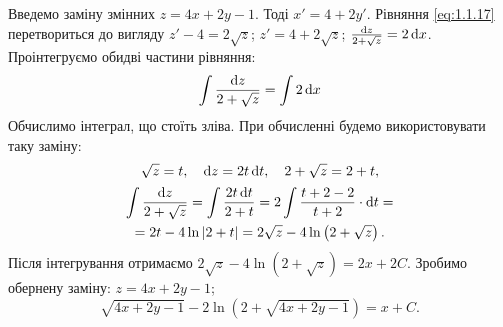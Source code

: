 \begin{solution}
	Введемо заміну змінних $z = 4 x + 2 y - 1$. Тоді $x' = 4 + 2 y'$. Рівняння \eqref{eq:1.1.17} перетвориться до вигляду $z' - 4 = 2 \sqrt{z}$; $z' = 4 + 2 \sqrt{z}$; $\frac{\mathop{}\!\mathrm{d} z}{2 + \sqrt{z}} = 2 \mathop{}\!\mathrm{d} x$. Проінтегруємо обидві частини рівняння:
	\begin{equation}
		\label{eq:1.1.18}
		\int \frac{\mathop{}\!\mathrm{d} z}{2 + \sqrt{z}} = \int 2 \mathop{}\!\mathrm{d} x
	\end{equation}
	Обчислимо інтеграл, що стоїть зліва. При обчисленні будемо використовувати таку заміну: 
	\begin{equation*}
		\sqrt{z} = t, \quad \mathop{}\!\mathrm{d} z = 2 t \mathop{}\!\mathrm{d} t, \quad 2 + \sqrt{z} = 2 + t,
	\end{equation*}
	\begin{multline}
		\label{eq:1.1.19}
		\int \frac{\mathop{}\!\mathrm{d} z}{2 + \sqrt{z}} = \int \frac{2 t \mathop{}\!\mathrm{d} t}{2 + t} = 2 \int \frac{t + 2 - 2}{t + 2} \cdot \mathop{}\!\mathrm{d} t = \\
		= 2 t - 4 \ln |2 + t| = 2 \sqrt{z} - 4 \ln \left(2 + \sqrt{z}\right).
	\end{multline}
	Після інтегрування отримаємо $2 \sqrt{z} - 4 \ln \left(2 + \sqrt{z}\right) = 2 x + 2 C$. Зробимо обернену заміну: $z = 4x + 2y - 1$;
	\begin{equation}
		\label{eq:1.1.20}
		\sqrt{4x + 2y - 1} - 2 \ln \left(2 + \sqrt{4x + 2y - 1}\right) = x + C.
	\end{equation}
\end{solution}

